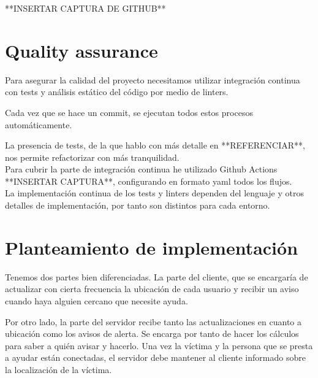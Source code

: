 **INSERTAR CAPTURA DE GITHUB**

\section{Quality assurance}

Para asegurar la calidad del proyecto necesitamos utilizar integración continua con tests y análisis estático del código por medio de linters.

Cada vez que se hace un commit, se ejecutan todos estos procesos automáticamente.

La presencia de tests, de la que hablo con más detalle en **REFERENCIAR**, nos permite refactorizar con más 
tranquilidad. \\

Para cubrir la parte de integración continua he utilizado Github Actions **INSERTAR CAPTURA**, configurando en formato yaml todos los flujos.\\
La implementación continua de los tests y linters dependen del lenguaje y otros detalles de implementación, por tanto
son distintos para cada entorno.

\section{Planteamiento de implementación}

Tenemos dos partes bien diferenciadas. La parte del cliente, que se encargaría de actualizar con cierta frecuencia
la ubicación de cada usuario y recibir un aviso cuando haya alguien cercano que necesite ayuda.

Por otro lado, la parte del servidor recibe tanto las actualizaciones en cuanto a ubicación como 
los avisos de alerta. Se encarga por tanto de hacer los cálculos para saber a quién avisar y hacerlo. 
Una vez la víctima y la persona que se presta a ayudar están conectadas, el servidor debe mantener
al cliente informado sobre la localización de la víctima.